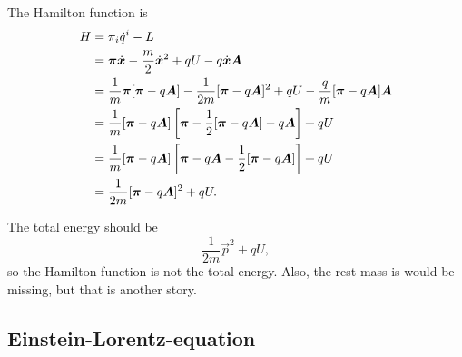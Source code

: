 \documentclass[11pt, english, fleqn, DIV=15, headinclude, BCOR=1cm]{scrartcl}
\begin{document}
The Hamilton function is
\begin{align*}
    H
    &= \pi_i \dot q^i - L \\
    &= \boldsymbol{\pi} \dot{\boldsymbol{x}} - \frac m2 \dot{\boldsymbol{x}}^2 + qU - q \dot{\boldsymbol{x}}
    \boldsymbol{A} \\
    &= \frac 1m \boldsymbol{\pi} [\boldsymbol{\pi} - q \boldsymbol{A}] - \frac1{2m} [\boldsymbol{\pi} - q \boldsymbol{A}]^2 + qU -
    \frac qm [\boldsymbol{\pi} - q \boldsymbol{A}] \boldsymbol{A} \\
    &= \frac 1m [\boldsymbol{\pi} - q \boldsymbol{A}] \left[ \boldsymbol{\pi} - \frac12 [\boldsymbol{\pi} - q \boldsymbol{A}] -
    q \boldsymbol{A} \right] + qU \\
    &= \frac 1m [\boldsymbol{\pi} - q \boldsymbol{A}] \left[ \boldsymbol{\pi} -
    q \boldsymbol{A} - \frac12 [\boldsymbol{\pi} - q \boldsymbol{A}] \right] + qU \\
    &= \frac 1{2m} [\boldsymbol{\pi} - q \boldsymbol{A}]^2 + qU.
\end{align*}

The total energy should be
\[
    \frac{1}{2m} \vec p^2 + qU,
\]
so the Hamilton function is not the total energy. Also, the rest mass is
would be missing, but that is another story. 

\subsection{Einstein-Lorentz-equation}
\end{document}
